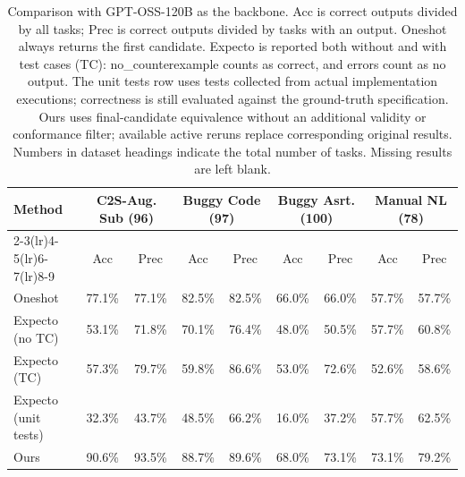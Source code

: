 \begin{table}[t]
\centering
\footnotesize
\setlength{\tabcolsep}{3pt}
\renewcommand{\arraystretch}{1.15}
\begin{tabular}{lcccccccc}
\toprule
\textbf{Method} & \multicolumn{2}{c}{\textbf{C2S-Aug. Sub (96)}} & \multicolumn{2}{c}{\textbf{Buggy Code (97)}} & \multicolumn{2}{c}{\textbf{Buggy Asrt. (100)}} & \multicolumn{2}{c}{\textbf{Manual NL (78)}} \\
\cmidrule(lr){2-3}\cmidrule(lr){4-5}\cmidrule(lr){6-7}\cmidrule(lr){8-9}
& Acc & Prec & Acc & Prec & Acc & Prec & Acc & Prec \\
\midrule
Oneshot & 77.1\% & 77.1\% & 82.5\% & 82.5\% & 66.0\% & 66.0\% & 57.7\% & 57.7\% \\
Expecto (no TC) & 53.1\% & 71.8\% & 70.1\% & 76.4\% & 48.0\% & 50.5\% & 57.7\% & 60.8\% \\
Expecto (TC) & 57.3\% & 79.7\% & 59.8\% & 86.6\% & 53.0\% & 72.6\% & 52.6\% & 58.6\% \\
Expecto (unit tests) & 32.3\% & 43.7\% & 48.5\% & 66.2\% & 16.0\% & 37.2\% & 57.7\% & 62.5\% \\
Ours & 90.6\% & 93.5\% & 88.7\% & 89.6\% & 68.0\% & 73.1\% & 73.1\% & 79.2\% \\
\bottomrule
\end{tabular}
\caption{Comparison with GPT-OSS-120B as the backbone. Acc is correct outputs divided by all tasks; Prec is correct outputs divided by tasks with an output. Oneshot always returns the first candidate. Expecto is reported both without and with test cases (TC): no\_counterexample counts as correct, and errors count as no output. The unit tests row uses tests collected from actual implementation executions; correctness is still evaluated against the ground-truth specification. Ours uses final-candidate equivalence without an additional validity or conformance filter; available active reruns replace corresponding original results. Numbers in dataset headings indicate the total number of tasks. Missing results are left blank.}
\label{tab:baseline-comparison-sub}
\end{table}
